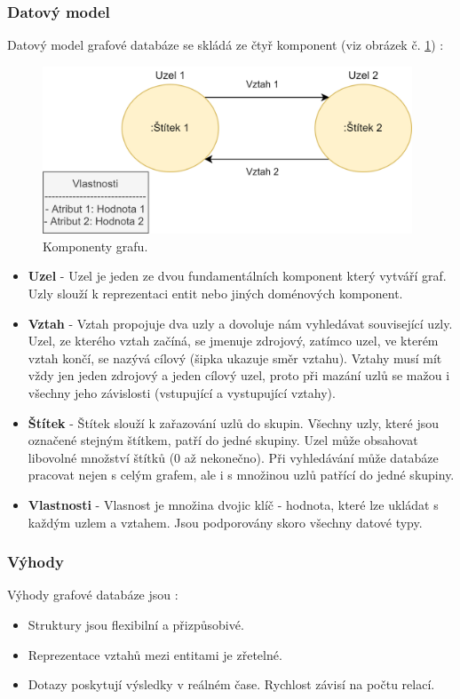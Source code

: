 \subsubsection{Datový model}
Datový model grafové databáze se skládá ze čtyř komponent (viz obrázek č. \ref{fig:graph_components}) \cite{data_model_graph}:
	\begin{figure}[H]
	\centering
	\includegraphics[width=11cm]{img/databaze/graph_components}
	\caption{Komponenty grafu.}
	\label{fig:graph_components}
	\end{figure}
\begin{itemize}
\item \textbf{Uzel} - Uzel je jeden ze dvou fundamentálních komponent který vytváří graf. Uzly slouží k reprezentaci entit nebo jiných doménových komponent.
\item \textbf{Vztah} - Vztah propojuje dva uzly a dovoluje nám vyhledávat související uzly. Uzel, ze kterého vztah začíná, se jmenuje zdrojový, zatímco uzel, ve kterém vztah končí, se nazývá cílový (šipka ukazuje směr vztahu). Vztahy musí mít vždy jen jeden zdrojový a jeden cílový uzel, proto při mazání uzlů se mažou i všechny jeho závislosti (vstupující a vystupující vztahy).
\item \textbf{Štítek} - Štítek slouží k zařazování uzlů do skupin. Všechny uzly, které jsou označené stejným štítkem, patří do jedné skupiny. Uzel může obsahovat libovolné množství štítků (0 až nekonečno). Při vyhledávání může databáze pracovat nejen s celým grafem, ale i s množinou uzlů patřící do jedné skupiny.
\item \textbf{Vlastnosti} - Vlasnost je množina dvojic klíč - hodnota, které lze ukládat s každým uzlem a vztahem. Jsou podporovány skoro všechny datové typy.
\end{itemize}

\subsubsection{Výhody}
Výhody grafové databáze jsou \cite{advantages_graph}:
\begin{itemize}
\item Struktury jsou flexibilní a přizpůsobivé.
\item Reprezentace vztahů mezi entitami je zřetelné.
\item Dotazy poskytují výsledky v reálném čase. Rychlost závisí na počtu relací.
\end{itemize}

